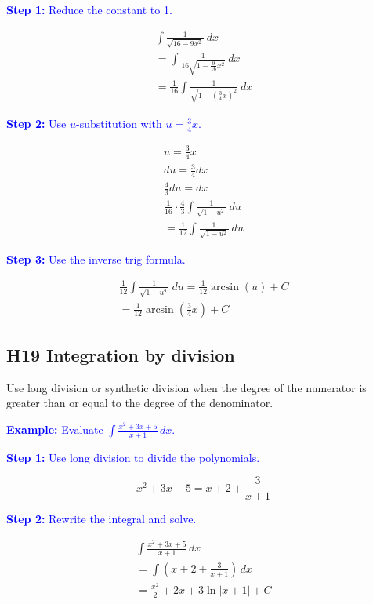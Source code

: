 \documentclass[letterpaper, 12pt]{article}
\newcommand{\example}[1]{\textcolor{blue}{\textbf{Example:} #1}}
\newcommand{\step}[2]{\textcolor{blue}{\textbf{Step #1:} #2}}
\begin{document}
\step{1}{Reduce the constant to 1.}

\begin{gather*}
\int \frac{1}{\sqrt{16 - 9x^2}} \: dx \\
= \int \frac{1}{16\sqrt{1 - \frac{9}{16}x^2}} \: dx \\
= \frac{1}{16} \int \frac{1}{\sqrt{1 - \left(\frac{3}{4}x\right)^2}} \: dx
\end{gather*}

\step{2}{Use $u$-substitution with $u = \frac{3}{4}x$.}

\begin{gather*}
u = \frac{3}{4}x \\
du = \frac{3}{4} dx \\
\frac{4}{3} du = dx \\
\frac{1}{16} \cdot \frac{4}{3} \int \frac{1}{\sqrt{1 - u^2}} \: du \\
= \frac{1}{12} \int \frac{1}{\sqrt{1 - u^2}} \: du
\end{gather*}

\step{3}{Use the inverse trig formula.}

\begin{gather*}
\frac{1}{12} \int \frac{1}{\sqrt{1 - u^2}} \: du = \frac{1}{12} \arcsin(u) + C \\
= \boxed{\frac{1}{12} \arcsin\left(\frac{3}{4}x\right) + C}
\end{gather*}

\subsection*{H19 Integration by division}

Use long division or synthetic division when the degree of the numerator is greater than or equal to the degree of the denominator.

\example{Evaluate $\displaystyle \int \frac{x^2 + 3x + 5}{x + 1} \, dx$.}

\step{1}{Use long division to divide the polynomials.}

$$x^2 + 3x + 5 = x + 2 + \frac{3}{x + 1}$$

\step{2}{Rewrite the integral and solve.}

\begin{gather*}
\int \frac{x^2 + 3x + 5}{x + 1} \, dx \\
= \int (x + 2 + \frac{3}{x + 1}) \, dx \\
= \boxed{\frac{x^2}{2} + 2x + 3 \ln|x + 1| + C} \\
\end{gather*}
\end{document}
